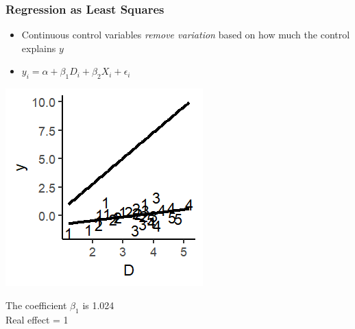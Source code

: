 \documentclass[xcolor=x11names,compress]{beamer}\usepackage[]{graphicx}\usepackage[]{color}
\makeatletter
\def\maxwidth{ %
  \ifdim\Gin@nat@width>\linewidth
    \linewidth
  \else
    \Gin@nat@width
  \fi
}
\newenvironment{knitrout}{}{} %
\renewcommand{\(}{\begin{columns}}
\renewcommand{\)}{\end{columns}}
\newcommand{\<}[1]{\begin{column}{#1}}
\renewcommand{\>}{\end{column}}
\makeatother
\begin{document}
\begin{frame}
\frametitle{Regression as Least Squares}
\begin{itemize}
\item Continuous control variables \textit{remove variation} based on how much the control explains $y$
\item $y_i = \alpha + \beta_1 D_i + \beta_2 X_i + \epsilon_i$
\end{itemize}
\begin{multicols}{2}
\begin{knitrout}
\color{fgcolor}
\includegraphics[width=\maxwidth]{figure/graph_ols_control3-1} 

\end{knitrout}
\columnbreak

The coefficient $\beta_1$ is 1.024 \\
Real effect = 1
\end{multicols}
\end{frame}
\end{document}
